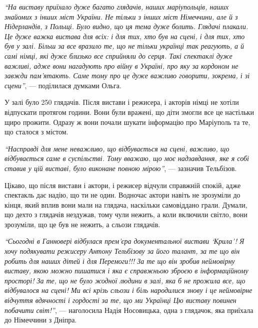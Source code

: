 \begin{leftbar}
\emph{\enquote{На виставу приїхало дуже багато глядачів, наших маріупольців, наших
знайомих з інших міст України. Не тільки з інших міст Німеччини, але й
з Нідерландів, з Польщі. Було видно, що ця тема дуже болить. Глядачі
плакали. Це дуже важка вистава для всіх: і для тих, хто був на сцені, і
для тих, хто був у залі. Більш за все вразило те, що не тільки українці
так реагують, а й самі німці, які дуже близько все сприйняли до серця.
Такі спектаклі дуже важливі, адже вони нагадують про війну в Україні,
про яку за кордоном не завжди пам'ятають. Саме тому про це дуже важливо
говорити, зокрема, і зі сцени}}, — поділилася думками Ольга.
\end{leftbar}


У залі було 250 глядачів. Після вистави і режисера, і акторів німці не хотіли
відпускати протягом години. Вони були вражені, що діти змогли все це настільки
щиро прожити. Одразу ж вони почали шукати інформацію про Маріуполь та те, що
сталося з містом.

\begin{leftbar}
\emph{\enquote{Насправді для мене неважливо, що відбувається на сцені, важливо, що
відбувається саме в суспільстві. Тому вважаю, що моє надзавдання, яке я
собі ставив у цій виставі, було виконане повною мірою}}, — зазначив
Тельбізов.
\end{leftbar}

Цікаво, що після вистави і актори, і режисер відчули справжній спокій, адже
спектакль дає надію, що ти не один. Водночас актори навіть не зрозуміли до
кінця, який вплив вони мали на глядача, наскільки самовіддано грали. Думали, що
дехто з глядачів нездужав, тому чули нежить, а коли включили світло, вони
зрозуміли, що це був не нежить, а сльози глядачів.


\begin{leftbar}
\emph{\enquote{Сьогодні в Ганновері відбулася прем'єра документальної вистави \enquote{Крила}! Я хочу
подякувати режисеру Антону Тельбізову за його талант, за те що він робить для
наших дітей і для Перемоги!!! За те що він зробив неймовірну виставу, якою
можно пишатися і яка є справжньою зброєю в інформаційному просторі! За те, що
не було жодної людини в залі, яка б не прожила все, що відбувалося на сцені! Ми
всі крізь сльози і біль народилися знову і це неймовірне відчуття вдячності і
гордості за те, що ми Українці Цю виставу повинен побачити світ!}}, — наголосила
Надія Носовицька, одна з глядачок, яка приїхала до Німеччини з Дніпра.
\end{leftbar}

